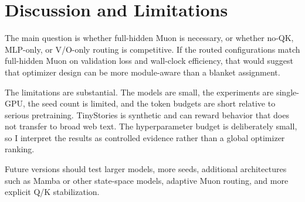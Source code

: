 \section{Discussion and Limitations}

The main question is whether full-hidden Muon is necessary, or whether no-QK, MLP-only, or V/O-only routing is competitive. If the routed configurations match full-hidden Muon on validation loss and wall-clock efficiency, that would suggest that optimizer design can be more module-aware than a blanket assignment.

The limitations are substantial. The models are small, the experiments are single-GPU, the seed count is limited, and the token budgets are short relative to serious pretraining. TinyStories is synthetic and can reward behavior that does not transfer to broad web text. The hyperparameter budget is deliberately small, so I interpret the results as controlled evidence rather than a global optimizer ranking.

Future versions should test larger models, more seeds, additional architectures such as Mamba or other state-space models, adaptive Muon routing, and more explicit Q/K stabilization.
